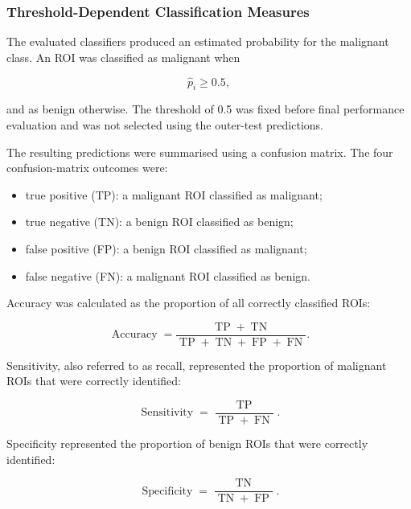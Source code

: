 \documentclass[12pt,twocolumn]{article}
\begin{document}
\subsubsection{Threshold-Dependent Classification Measures}
\label{subsubsec:threshold_metrics}

The evaluated classifiers produced an estimated probability for the
malignant class. An ROI was classified as malignant when

\begin{equation}
\widehat{p}_i \geq 0.5,
\label{eq:classification_threshold}
\end{equation}

and as benign otherwise. The threshold of 0.5 was fixed before final
performance evaluation and was not selected using the outer-test
predictions.

The resulting predictions were summarised using a confusion matrix.
The four confusion-matrix outcomes were:

\begin{itemize}
    \item true positive (TP): a malignant ROI classified as malignant;
    \item true negative (TN): a benign ROI classified as benign;
    \item false positive (FP): a benign ROI classified as malignant;
    \item false negative (FN): a malignant ROI classified as benign.
\end{itemize}

Accuracy was calculated as the proportion of all correctly classified
ROIs:

\begin{equation}
\operatorname{Accuracy}
=
\frac{\operatorname{TP}+\operatorname{TN}}
{\operatorname{TP}+\operatorname{TN}
+\operatorname{FP}+\operatorname{FN}}.
\label{eq:accuracy}
\end{equation}

Sensitivity, also referred to as recall, represented the proportion of
malignant ROIs that were correctly identified:

\begin{equation}
\operatorname{Sensitivity}
=
\frac{\operatorname{TP}}
{\operatorname{TP}+\operatorname{FN}}.
\label{eq:sensitivity}
\end{equation}

Specificity represented the proportion of benign ROIs that were
correctly identified:

\begin{equation}
\operatorname{Specificity}
=
\frac{\operatorname{TN}}
{\operatorname{TN}+\operatorname{FP}}.
\label{eq:specificity}
\end{equation}
\end{document}
